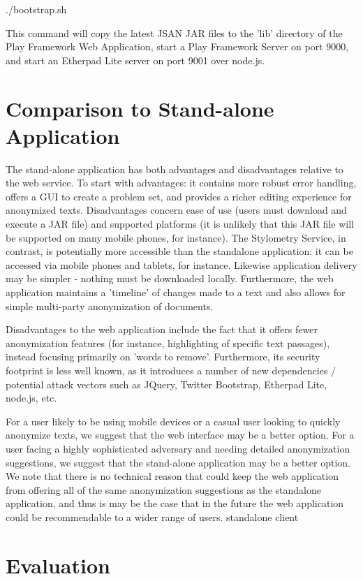 \documentclass[letterpaper]{article}
\begin{document}
./bootstrap.sh

This command will copy the latest JSAN JAR files to the 'lib'
directory of the Play Framework Web Application, start a Play
Framework Server on port 9000, and start an Etherpad Lite server on
port 9001 over node.js.

\section{Comparison to Stand-alone Application}

The stand-alone application has both advantages and disadvantages
relative to the web service. To start with advantages: it contains
more robust error handling, offers a GUI to create a problem set, and
provides a richer editing experience for anonymized
texts. Disadvantages concern ease of use (users must download and
execute a JAR file) and supported platforms (it is unlikely that this
JAR file will be supported on many mobile phones, for instance). The
Stylometry Service, in contrast, is potentially more accessible than
the standalone application: it can be accessed via mobile phones and
tablets, for instance. Likewise application delivery may be simpler -
nothing must be downloaded locally. Furthermore, the web application
maintains a 'timeline' of changes made to a text and also allows for
simple multi-party anonymization of documents.

Disadvantages to the web application include the fact that it offers fewer anonymization
features (for instance, highlighting of specific text passages),
instead focusing primarily on 'words to remove'. Furthermore, its
security footprint is less well known, as it introduces a number of
new dependencies / potential attack vectors such as JQuery, Twitter
Bootstrap, Etherpad Lite, node.js, etc.

For a user likely to be using
mobile devices or a casual user looking to quickly anonymize texts,
we suggest that the web interface may be a better option. For a user
facing a highly sophisticated adversary and needing detailed
anonymization suggestions, we suggest that the stand-alone application
may be a better option. We note that there is no technical reason that
could keep the web application from offering all of the same
anonymization suggestions as the standalone application, and thus is
may be the case that in the future the web application could be
recommendable to a wider range of users.
standalone client

\section{Evaluation}
\end{document}
